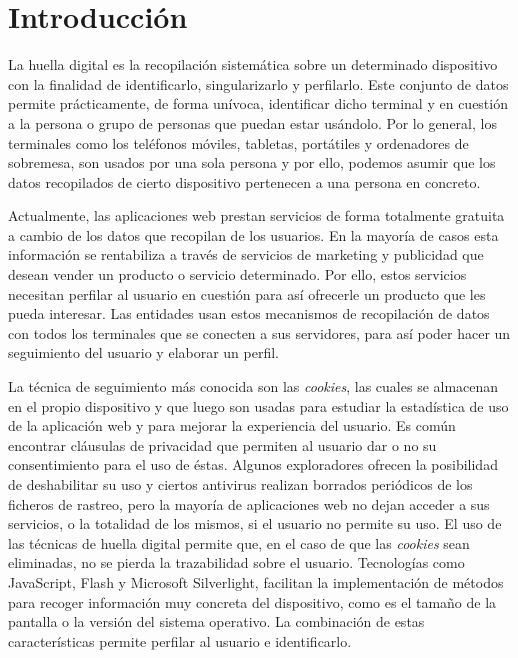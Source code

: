 \chapter{Introducción}

La huella digital es la recopilación sistemática sobre un determinado dispositivo con la finalidad de identificarlo, singularizarlo y perfilarlo. Este conjunto de datos permite prácticamente, de forma unívoca, identificar dicho terminal y en cuestión a la persona o grupo de personas que puedan estar usándolo. Por lo general, los terminales como los teléfonos móviles, tabletas, portátiles y ordenadores de sobremesa, son usados por una sola persona y por ello, podemos asumir que los datos recopilados de cierto dispositivo pertenecen a una persona en concreto.\par

Actualmente, las aplicaciones web prestan servicios de forma totalmente gratuita a cambio de los datos que recopilan de los usuarios. En la mayoría de casos esta información se rentabiliza a través de servicios de marketing y publicidad que desean vender un producto o servicio determinado. Por ello, estos servicios necesitan perfilar al usuario en cuestión para así ofrecerle un producto que les pueda interesar. Las entidades usan estos mecanismos de recopilación de datos con todos los terminales que se conecten a sus servidores, para así poder hacer un seguimiento del usuario y elaborar un perfil.\par

La técnica de seguimiento más conocida  son las \textit{cookies}, las cuales se almacenan en el propio dispositivo y que luego son usadas para estudiar la estadística de uso de la aplicación web y para mejorar la experiencia del usuario. Es común encontrar cláusulas de privacidad que permiten al usuario dar o no su consentimiento para el uso de éstas. Algunos exploradores ofrecen la posibilidad de deshabilitar su uso y ciertos antivirus realizan borrados periódicos de los ficheros de rastreo, pero la mayoría de aplicaciones web no dejan acceder a sus servicios, o la totalidad de los mismos, si el usuario no permite su uso. El uso de las técnicas de huella digital permite que, en el caso de que las \textit{cookies} sean eliminadas, no se pierda la trazabilidad sobre el usuario. Tecnologías como JavaScript, Flash y Microsoft Silverlight, facilitan la implementación de métodos para recoger información muy concreta del dispositivo, como es el tamaño de la pantalla o la versión del sistema operativo. La combinación de estas características permite perfilar al usuario e identificarlo.  \par

